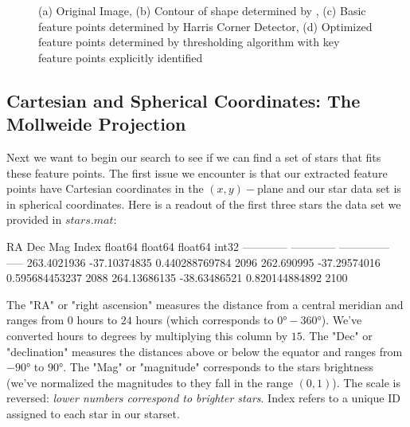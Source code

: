 \documentclass[paper=a4, fontsize=11pt]{scrartcl} %
\begin{document}
\begin{figure}
\caption{(a) Original Image, (b) Contour of shape determined by \cite{Suzuki1985}, (c) Basic feature points determined by Harris Corner Detector, (d) Optimized feature points determined by thresholding algorithm with key feature points explicitly identified}
\label{feat_detect}
\end{figure}


\subsection{Cartesian and Spherical Coordinates: The Mollweide Projection}
Next we want to begin our search to see if we can find a set of stars that fits these feature points. The first issue we encounter is that our extracted feature points have Cartesian coordinates in the $(x,y)-$plane and our star data set is in spherical coordinates. Here is a readout of the first three stars the data set we provided in $stars.mat$:
\begin{python}
	     RA          Dec           Mag       Index
	  float64      float64       float64     int32
	------------ ------------ -------------- -----
	 263.4021936 -37.10374835 0.440288769784  2096
	  262.690995 -37.29574016 0.595684453237  2088
	264.13686135 -38.63486521 0.820144884892  2100
\end{python}
The "RA" or "right ascension" measures the distance from a central meridian and ranges from $0$ hours to $24$ hours (which corresponds to $0\si{\degree}-360\si{\degree}$). We've converted hours to degrees by multiplying this column by $15$.
The "Dec" or "declination" measures the distances above or below the equator and ranges from $-90\si{\degree}$ to $90\si{\degree}$. The "Mag" or "magnitude" corresponds to the stars brightness (we've normalized the magnitudes to they fall in the range $(0,1)$). The scale is reversed: \textit{lower numbers correspond to brighter stars}.
Index refers to a unique ID assigned to each star in our starset.
\end{document}
